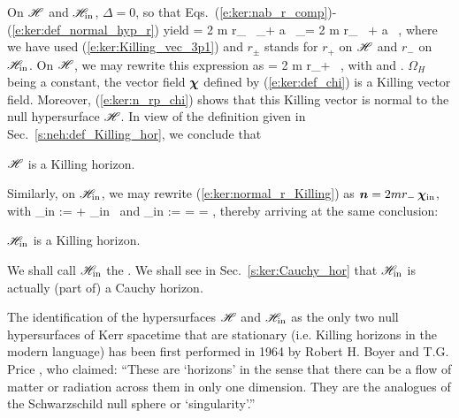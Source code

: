 On $\mathscr{H}$ and $\mathscr{H}_{\rm in}$, $\Delta=0$, so that
Eqs.~(\ref{e:ker:nab_r_comp})-(\ref{e:ker:def_normal_hyp_r})
yield
\be \label{e:ker:normal_r_Killing}
     = 2 m r_{\pm} \, \wpar_\ti + a \, \wpar_\tph = 2 m r_{\pm} \, \w{\xi}
        + a \, \w{\eta} ,
\ee
where we have used (\ref{e:ker:Killing_vec_3p1}) and $r_{\pm}$ stands for
$r_+$ on $\mathscr{H}$ and $r_-$ on $\mathscr{H}_{\rm in}$.
On $\mathscr{H}$, we may rewrite this expression as
\be \label{e:ker:n_rp_chi}
     = 2 m r_+ \, \w{\chi} ,
\ee
with
\be \label{e:ker:def_chi}
\ee
and
\be \label{e:ker:def_OmegaH}
    .
\ee
$\Omega_H$ being a constant, the vector field $\bm{\chi}$ defined by
(\ref{e:ker:def_chi}) is a Killing vector field. Moreover, (\ref{e:ker:n_rp_chi})
shows that this Killing vector is normal to the null hypersurface $\mathscr{H}$.
In view of the definition given in Sec.~\ref{s:neh:def_Killing_hor}, we
conclude that
\begin{greybox}
$\mathscr{H}$ is a Killing horizon.
\end{greybox}

Similarly, on $\mathscr{H}_{\rm in}$, we may rewrite (\ref{e:ker:normal_r_Killing})
as $\bm{n} = 2 m r_- \, \bm{\chi}_{\rm in}$, with
\be \label{e:ker:def_chi_in}
    \w{\chi}_{\rm in} := \w{\xi} + \Omega_{\rm in} \, \w{\eta}
\ee
and
\be \label{e:ker:def_Omega_in}
    \Omega_{\rm in} :=  = 
        =  ,
\ee
thereby arriving at the same conclusion:
\begin{greybox}
$\mathscr{H}_{\rm in}$ is a Killing horizon.
\end{greybox}
We shall call $\mathscr{H}_{\rm in}$ the . We shall see in Sec.~\ref{s:ker:Cauchy_hor} that $\mathscr{H}_{\rm in}$
is actually (part of) a Cauchy horizon.

\begin{hist}
The identification of the hypersurfaces $\mathscr{H}$ and $\mathscr{H}_{\rm in}$
as the only two null hypersurfaces of Kerr spacetime that are stationary
(i.e. Killing horizons in the modern language) has been first performed in
1964 by Robert H. Boyer
and T.G. Price \cite{BoyerP65}, who claimed: ``These are `horizons'
in the sense that there can be a flow of matter or radiation across them in only one dimension. They are the analogues of the Schwarzschild null sphere or `singularity'.''
\end{hist}

